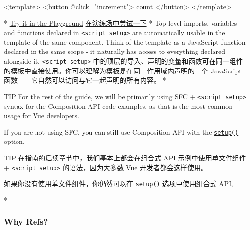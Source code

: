 \begin{paracol}{2}
\begin{codeVue}
<template>
    <button @click="increment">
    {{ count }}
    </button>
</template>
\end{codeVue}
\switchcolumn[0]*%
\href{https://play.vuejs.org/\#eNo9jUEKgzAQRa8yZKMiaNcllvYe2dgwQqiZhDhxE3L3jrW4/DPvv1/UK8Zhz6juSm82uciwIef4MOR8DImhQMIFKiwpeGgEbQwZsoE2BhsyMUwH0d66475ksuwCgSOb0CNx20ExBCc77POase8NVUN6PBdlSwKjj+vMKAlAvzOzWJ52dfYzGXXpjPoBAKX856uopDGeFfnq8XKp+gWq4FAi}{Try
it in the Playground}
\switchcolumn
\href{https://play.vuejs.org/\#eNo9jUEKgzAQRa8yZKMiaNcllvYe2dgwQqiZhDhxE3L3jrW4/DPvv1/UK8Zhz6juSm82uciwIef4MOR8DImhQMIFKiwpeGgEbQwZsoE2BhsyMUwH0d66475ksuwCgSOb0CNx20ExBCc77POase8NVUN6PBdlSwKjj+vMKAlAvzOzWJ52dfYzGXXpjPoBAKX856uopDGeFfnq8XKp+gWq4FAi}{在演练场中尝试一下}
\switchcolumn[0]*%
Top-level imports, variables and functions declared in
\texttt{\textless{}script\ setup\textgreater{}} are automatically usable
in the template of the same component. Think of the template as a
JavaScript function declared in the same scope - it naturally has access
to everything declared alongside it.
\switchcolumn
\texttt{\textless{}script\ setup\textgreater{}} 中的顶层的导入、声明的变量和函数可在同一组件的模板中直接使用。你可以理解为模板是在同一作用域内声明的一个 JavaScript 函数——它自然可以访问与它一起声明的所有内容。
\switchcolumn[0]*%
\begin{vueQuote}{TIP}
For the rest of the guide, we will be primarily using SFC +
\texttt{\textless{}script\ setup\textgreater{}} syntax for the
Composition API code examples, as that is the most common usage for Vue
developers.

If you are not using SFC, you can still use Composition API with the
\href{https://vuejs.org/api/composition-api-setup.html}{\texttt{setup()}}
option.
\end{vueQuote} 
\switchcolumn
\begin{vueQuote}{TIP}
在指南的后续章节中，我们基本上都会在组合式 API 示例中使用单文件组件 +
\texttt{\textless{}script\ setup\textgreater{}} 的语法，因为大多数 Vue
开发者都会这样使用。

如果你没有使用单文件组件，你仍然可以在
\href{https://cn.vuejs.org/api/composition-api-setup.html}{\texttt{setup()}}
选项中使用组合式 API。
\end{vueQuote} 

\switchcolumn[0]*%
\subsubsection{Why Refs?}
\switchcolumn

\end{paracol}
